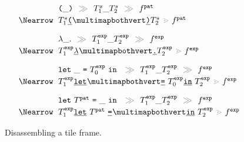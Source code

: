 \begin{figure}
  \newcommand{\vstretch}{\vspace{0.3cm}}
  \[
    \arraycolsep=3pt
    \def\arraystretch{1.2}
    \begin{array}{rl}
      & \tframelit{
        \sparen{\_}
      }{
        \tframelit{\tiles^s_1\_\tiles^s_2}{\tfrelem^{\pat}}
      } \\
      \tframedu
      & \zipper{
        \pointing{\tiles^s_1\shardlit{\texttt{(}}~}{~\shardlit{\texttt{)}}\tiles^s_2}
      }{
        \tfrelem^{\pat}
      } \vstretch \\

      & \tframelit{
        \slam{\_}{}
      }{
        \tframelit{\tiles^{\expr}_1\_\tiles^{\expr}_2}{\tfrelem^{\expr}}
      } \\
      \tframedu
      & \zipper{
        \pointing{\tiles^{\expr}_1\shardlit{$\lambda$}~}{~\shardlit{\texttt{.}}\tiles^{\expr}_2}
      }{
        \tfrelem^{\expr}
      } \vstretch \\

      & \tframelit{
        \slet{\_}{\tiles^{\expr}_0}{}
      }{
        \tframelit{\tiles^{\expr}_1\_\tiles^{\expr}_2}{\tfrelem^{\expr}}
      } \\
      \tframedu
      & \zipper{
        \pointing{
          \tiles^{\expr}_1\shardlit{\texttt{let}}~
        }{
          ~\shardlit{\texttt{=}}~\tiles^{\expr}_0\shardlit{\texttt{in}}~\tiles^{\expr}_2
        }
      }{
        \tfrelem^{\expr}
      } \vstretch \\

      & \tframelit{
        \slet{\tiles^{\pat}}{\_}{}
      }{
        \tframelit{\tiles^{\expr}_1\_\tiles^{\expr}_2}{\tfrelem^{\expr}}
      } \\
      \tframedu
      & \zipper{
        \pointing{
          \tiles^{\expr}_1\shardlit{\texttt{let}}~\tiles^{\pat}~\shardlit{\texttt{=}}~
        }{
          ~\shardlit{\texttt{in}}~\tiles^{\expr}_2
        }
      }{
        \tfrelem^{\expr}
      }
  \end{array}\]
  \caption{
    Disassembling a tile frame. 
  }
  \label{fig:disassemble-tile}
\end{figure}